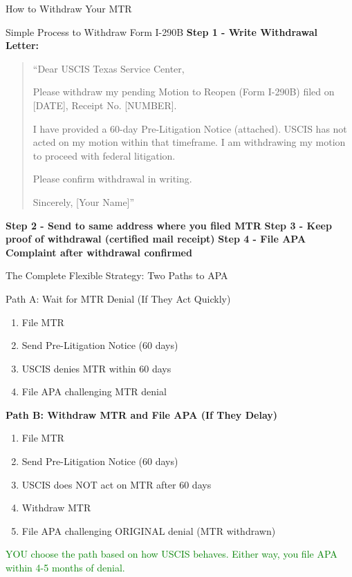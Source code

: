 \documentclass[11pt]{beamer}
\begin{document}
	\begin{frame}{How to Withdraw Your MTR}
		\scriptsize
		\begin{block}{Simple Process to Withdraw Form I-290B}
			\textbf{Step 1 - Write Withdrawal Letter:}
			\begin{quote}
				\scriptsize
				``Dear USCIS Texas Service Center,
				
				Please withdraw my pending Motion to Reopen (Form I-290B) filed on [DATE], Receipt No. [NUMBER].
				
				I have provided a 60-day Pre-Litigation Notice (attached). USCIS has not acted on my motion within that timeframe. I am withdrawing my motion to proceed with federal litigation.
				
				Please confirm withdrawal in writing.
				
				Sincerely,
				[Your Name]''
			\end{quote}
			\textbf{Step 2 - Send to same address where you filed MTR}
			\textbf{Step 3 - Keep proof of withdrawal (certified mail receipt)}
			\textbf{Step 4 - File APA Complaint after withdrawal confirmed}
		\end{block}
	\end{frame}
	
	\begin{frame}{The Complete Flexible Strategy: Two Paths to APA}
		\scriptsize
		\begin{block}{Path A: Wait for MTR Denial (If They Act Quickly)}
			\begin{enumerate}
				\item File MTR
				\item Send Pre-Litigation Notice (60 days)
				\item USCIS denies MTR within 60 days
				\item File APA challenging MTR denial
			\end{enumerate}
			\textbf{Path B: Withdraw MTR and File APA (If They Delay)}
			\begin{enumerate}
				\item File MTR
				\item Send Pre-Litigation Notice (60 days)
				\item USCIS does NOT act on MTR after 60 days
				\item Withdraw MTR
				\item File APA challenging ORIGINAL denial (MTR withdrawn)
			\end{enumerate}
			\textcolor{green}{YOU choose the path based on how USCIS behaves.}
			\textcolor{green}{Either way, you file APA within 4-5 months of denial.}
		\end{block}
	\end{frame}
	
\end{document}
